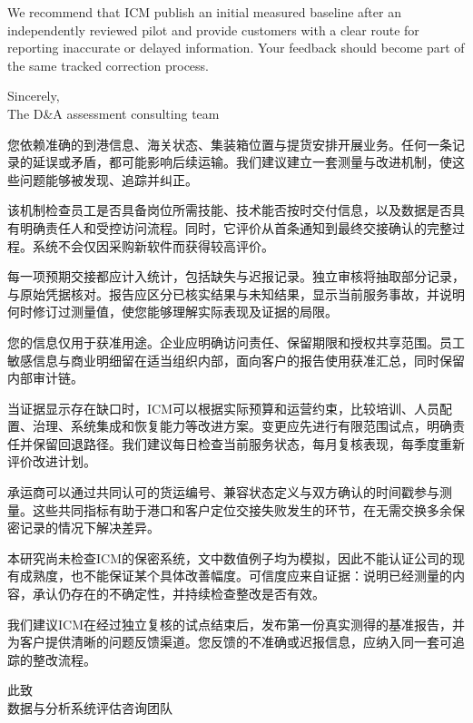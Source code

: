{We recommend that ICM publish an initial measured baseline after an independently reviewed pilot and provide customers with a clear route for reporting inaccurate or delayed information. Your feedback should become part of the same tracked correction process.

\noindent Sincerely,\\The D\&A assessment consulting team
}{您依赖准确的到港信息、海关状态、集装箱位置与提货安排开展业务。任何一条记录的延误或矛盾，都可能影响后续运输。我们建议建立一套测量与改进机制，使这些问题能够被发现、追踪并纠正。

该机制检查员工是否具备岗位所需技能、技术能否按时交付信息，以及数据是否具有明确责任人和受控访问流程。同时，它评价从首条通知到最终交接确认的完整过程。系统不会仅因采购新软件而获得较高评价。

每一项预期交接都应计入统计，包括缺失与迟报记录。独立审核将抽取部分记录，与原始凭据核对。报告应区分已核实结果与未知结果，显示当前服务事故，并说明何时修订过测量值，使您能够理解实际表现及证据的局限。

您的信息仅用于获准用途。企业应明确访问责任、保留期限和授权共享范围。员工敏感信息与商业明细留在适当组织内部，面向客户的报告使用获准汇总，同时保留内部审计链。

当证据显示存在缺口时，ICM可以根据实际预算和运营约束，比较培训、人员配置、治理、系统集成和恢复能力等改进方案。变更应先进行有限范围试点，明确责任并保留回退路径。我们建议每日检查当前服务状态，每月复核表现，每季度重新评价改进计划。

承运商可以通过共同认可的货运编号、兼容状态定义与双方确认的时间戳参与测量。这些共同指标有助于港口和客户定位交接失败发生的环节，在无需交换多余保密记录的情况下解决差异。

本研究尚未检查ICM的保密系统，文中数值例子均为模拟，因此不能认证公司的现有成熟度，也不能保证某个具体改善幅度。可信度应来自证据：说明已经测量的内容，承认仍存在的不确定性，并持续检查整改是否有效。

我们建议ICM在经过独立复核的试点结束后，发布第一份真实测得的基准报告，并为客户提供清晰的问题反馈渠道。您反馈的不准确或迟报信息，应纳入同一套可追踪的整改流程。

\noindent 此致\\数据与分析系统评估咨询团队
}


